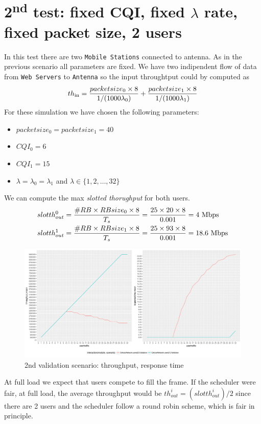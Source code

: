 \section{2\textsuperscript{nd} test: fixed CQI, fixed \(\lambda\) rate, fixed packet size, 2 users}
In this test there are two \texttt{Mobile Stations} connected to antenna. As in the previous scenario all parameters are fixed. We have two indipendent flow of data from \texttt{Web Servers} to \texttt{Antenna} so the input throughtput could by computed as
\begin{equation} 
th\textsubscript{in} = \frac{packetsize\textsubscript{0} \times 8}{1/(1000\lambda\textsubscript{0})} + \frac{packetsize\textsubscript{1} \times 8}{1/(1000\lambda\textsubscript{1})}
\end{equation}
For these simulation we have chosen the following parameters:
\begin{itemize}
	\item \(packetsize_{0} = packetsize_{1} = 40\)
	\item \(CQI_{0} = 6\)
	\item \(CQI_{1} = 15\)
	\item \(\lambda = \lambda_{0} = \lambda_{1}\) and \(\lambda \in \{1,2,\ldots,32\}\)
\end{itemize}
We can compute the max \textit{slotted thorughput} for both users.
\begin{align}
	slotth^{0}_{out} &= \frac{\#RB \times RBsize_{0} \times 8 }{T_s} = \frac{25 \times 20 \times 8}{0.001} = 4 \textnormal{ Mbps}\nonumber \\ 
	slotth^{1}_{out} &= \frac{\#RB \times RBsize_{1} \times 8 }{T_s} = \frac{25 \times 93 \times 8}{0.001} = 18.6 \textnormal{ Mbps} \nonumber
\end{align} 
\begin{figure}[H]
  \includegraphics[width=1\textwidth]{images/plotvalidation2}
  \caption{2nd validation scenario: throughput, response time}
  \label{fig:2nd validation scenario: throughput, response time}
\end{figure}
At full load we expect that users compete to fill the frame. If the scheduler were fair, at full load, the average throughput would be \(th^{i}_{out} = (slotth^{i}_{out})/2\) since there are 2 users and the scheduler follow a round robin scheme, which is fair in principle. 

